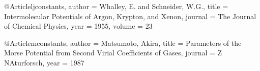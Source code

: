 @Article{ljconstants,
author = {Whalley, E. and Schneider, W.G.},
title = {Intermolecular Potentials of Argon, Krypton, and Xenon},
journal = {The Journal of Chemical Physics},
year = {1955},
volume = {23}
}

@Article{mconstants,
author = {Matsumoto, Akira},
title = {Parameters of the Morse Potential from Second Virial Coefficients of Gases},
journal = {Z NAturforsch},
year = {1987}
}
